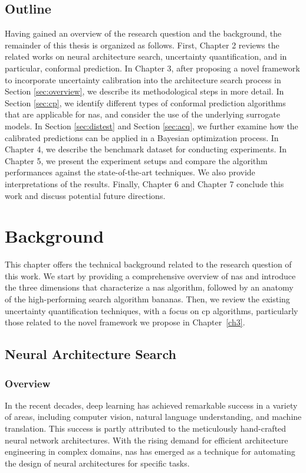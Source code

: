 \documentclass[a4paper,oneside,bibliography=totoc]{scrbook}
\begin{document}
\section{Outline}
Having gained an overview of the research question and the background, the remainder of this thesis is organized as follows. First, Chapter 2 reviews the related works on neural architecture search, uncertainty quantification, and in particular, conformal prediction. In Chapter 3, after proposing a novel framework to incorporate uncertainty calibration into the architecture search process in Section \ref{sec:overview}, we describe its methodological steps in more detail. In Section \ref{sec:cp}, we identify different types of conformal prediction algorithms that are applicable for \gls{nas}, and consider the use of the underlying surrogate models. In Section \ref{sec:distest} and Section \ref{sec:acq}, we further examine how the calibrated predictions can be applied in a Bayesian optimization process. In Chapter 4, we describe the benchmark dataset for conducting experiments. In Chapter 5, we present the experiment setups and  compare the algorithm performances against the state-of-the-art techniques. We also  provide interpretations of the results. Finally, Chapter 6 and Chapter 7 conclude this work and discuss potential future directions.


\chapter{Background}
This chapter offers the technical background related to the research question of this work. We start by providing a comprehensive overview of \gls{nas} and introduce the three dimensions that characterize a \gls{nas} algorithm, followed by an anatomy of the high-performing search algorithm \gls{bananas}. Then, we review the existing uncertainty quantification techniques, with a focus on \gls{cp} algorithms, particularly those related to the novel framework we propose in Chapter~\ref{ch3}.

\section{Neural Architecture Search}
\subsection{Overview}
\label{sec: nas}
In the recent decades, deep learning has achieved remarkable success in a variety of areas, including computer vision, natural language understanding, and machine translation. This success is partly attributed to the meticulously hand-crafted neural network architectures. With the rising demand for efficient architecture engineering in complex domains, \gls{nas} has emerged as a technique for automating the design of neural architectures for specific tasks.
 
\end{document}
